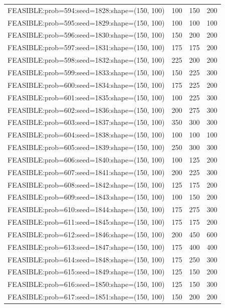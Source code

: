 \begin{longtable}{lccc}
FEASIBLE:prob=594:seed=1828:shape=(150, 100) &  100 &   150 &    200 \\
FEASIBLE:prob=595:seed=1829:shape=(150, 100) &  100 &   100 &    100 \\
FEASIBLE:prob=596:seed=1830:shape=(150, 100) &  150 &   200 &    200 \\
FEASIBLE:prob=597:seed=1831:shape=(150, 100) &  175 &   175 &    200 \\
FEASIBLE:prob=598:seed=1832:shape=(150, 100) &  225 &   200 &    200 \\
FEASIBLE:prob=599:seed=1833:shape=(150, 100) &  150 &   225 &    300 \\
FEASIBLE:prob=600:seed=1834:shape=(150, 100) &  175 &   225 &    200 \\
FEASIBLE:prob=601:seed=1835:shape=(150, 100) &  100 &   225 &    300 \\
FEASIBLE:prob=602:seed=1836:shape=(150, 100) &  200 &   275 &    300 \\
FEASIBLE:prob=603:seed=1837:shape=(150, 100) &  350 &   300 &    300 \\
FEASIBLE:prob=604:seed=1838:shape=(150, 100) &  100 &   100 &    100 \\
FEASIBLE:prob=605:seed=1839:shape=(150, 100) &  250 &   300 &    300 \\
FEASIBLE:prob=606:seed=1840:shape=(150, 100) &  100 &   125 &    200 \\
FEASIBLE:prob=607:seed=1841:shape=(150, 100) &  200 &   225 &    300 \\
FEASIBLE:prob=608:seed=1842:shape=(150, 100) &  125 &   175 &    200 \\
FEASIBLE:prob=609:seed=1843:shape=(150, 100) &  100 &   150 &    200 \\
FEASIBLE:prob=610:seed=1844:shape=(150, 100) &  175 &   275 &    300 \\
FEASIBLE:prob=611:seed=1845:shape=(150, 100) &  175 &   175 &    200 \\
FEASIBLE:prob=612:seed=1846:shape=(150, 100) &  200 &   450 &    600 \\
FEASIBLE:prob=613:seed=1847:shape=(150, 100) &  175 &   400 &    400 \\
FEASIBLE:prob=614:seed=1848:shape=(150, 100) &  175 &   250 &    300 \\
FEASIBLE:prob=615:seed=1849:shape=(150, 100) &  125 &   150 &    200 \\
FEASIBLE:prob=616:seed=1850:shape=(150, 100) &  125 &   150 &    300 \\
FEASIBLE:prob=617:seed=1851:shape=(150, 100) &  150 &   200 &    200 \\

\end{longtable}
